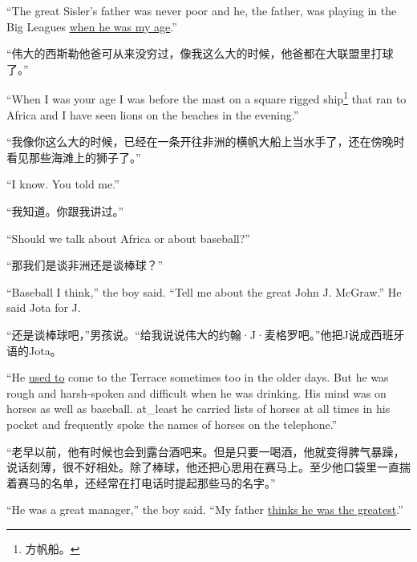 \begin{paracol}{2}
\switchcolumn*

``The great Sisler's father was never poor and he, the father, was playing
in the Big Leagues \uline{when he was my age}.''

\switchcolumn

“伟大的西斯勒他爸可从来没穷过，像我这么大的时候，他爸都在大联盟里打球了。”

\switchcolumn*

``When I was your age I was before the mast on a \gls{square}
  \gls{rigged} ship\footnote{方帆船。} that ran to Africa and I have seen
lions on the beaches in the evening.''

\switchcolumn

“我像你这么大的时候，已经在一条开往非洲的横帆大船上当水手了，还在傍晚时看见那些海滩上的狮子了。”

\switchcolumn*

``I know. You told me.''

\switchcolumn

“我知道。你跟我讲过。”

\switchcolumn*

``Should we talk about Africa or about baseball?''

\switchcolumn

“那我们是谈非洲还是谈棒球？”

\switchcolumn*

``Baseball I think,'' the boy said. ``Tell me about the great John J. McGraw.'' He said Jota for J.

\switchcolumn

“还是谈棒球吧，”男孩说。“给我说说伟大的约翰·J·麦格罗吧。”他把J说成西班牙语的Jota。

\switchcolumn*

``He \uline{used to} come to the Terrace sometimes too in the older days. But
he was \gls{rough} and \gls{harsh}-\gls{spoken} and difficult when he was
drinking. His mind was on \glspl{horse} as well as baseball. \Gls{at_least}
he carried lists of horses at all times in his pocket and \gls{frequently}
spoke the names of horses on the telephone.''

\switchcolumn

“老早以前，他有时候也会到露台酒吧来。但是只要一喝酒，他就变得脾气暴躁，说话刻薄，很不好相处。除了棒球，他还把心思用在赛马上。至少他口袋里一直揣着赛马的名单，还经常在打电话时提起那些马的名字。”

\switchcolumn*

``He was a great manager,'' the boy said. ``My father \uline{thinks he was the greatest}.''


\end{paracol}

